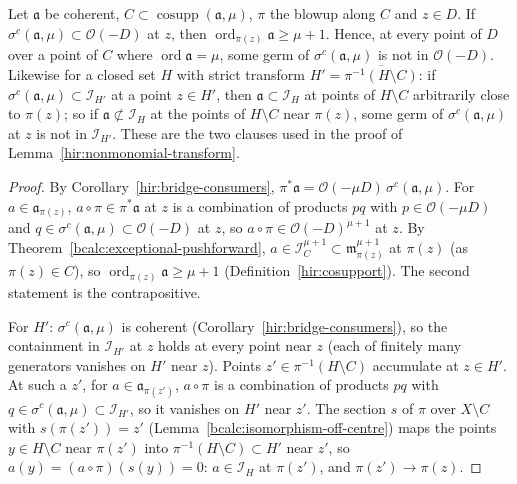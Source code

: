 \begin{corollary}
\label{bcalc:controlled-not-exceptional}
\mixedleanok
Let \(\mathfrak a\) be coherent, \(C\subset\operatorname{cosupp}(\mathfrak a,\mu)\), \(\pi\) the blowup along \(C\) and \(z\in D\). If \(\sigma^c(\mathfrak a,\mu)\subset\mathcal O(-D)\)
at \(z\), then \(\operatorname{ord}_{\pi(z)}\mathfrak a\ge\mu+1\). Hence, at every point of \(D\) over a point of \(C\) where \(\operatorname{ord}\mathfrak a=\mu\), some germ of
\(\sigma^c(\mathfrak a,\mu)\) is not in \(\mathcal O(-D)\). Likewise for a closed set \(H\) with strict transform \(H'=\overline{\pi^{-1}(H\setminus C)}\): if
\(\sigma^c(\mathfrak a,\mu)\subset\mathcal I_{H'}\) at a point \(z\in H'\), then \(\mathfrak a\subset\mathcal I_H\) at points of \(H\setminus C\) arbitrarily close to
\(\pi(z)\); so if \(\mathfrak a\not\subset\mathcal I_H\) at the points of \(H\setminus C\) near \(\pi(z)\), some germ of \(\sigma^c(\mathfrak a,\mu)\) at \(z\) is not in
\(\mathcal I_{H'}\). These are the two clauses used in the proof of Lemma~\ref{hir:nonmonomial-transform}.
\end{corollary}
\begin{proof}
\mixedleanok
By Corollary~\ref{hir:bridge-consumers}, \(\pi^*\mathfrak a=\mathcal O(-\mu D)\,\sigma^c(\mathfrak a,\mu)\). For \(a\in\mathfrak a_{\pi(z)}\), \(a\circ\pi\in\pi^*\mathfrak a\) at \(z\) is a
combination of products \(pq\) with \(p\in\mathcal O(-\mu D)\) and \(q\in\sigma^c(\mathfrak a,\mu)\subset\mathcal O(-D)\) at \(z\), so \(a\circ\pi\in\mathcal O(-D)^{\mu+1}\) at
\(z\). By Theorem~\ref{bcalc:exceptional-pushforward}, \(a\in\mathcal I_C^{\mu+1}\subset\mathfrak m_{\pi(z)}^{\mu+1}\) at \(\pi(z)\) (as \(\pi(z)\in C\)), so
\(\operatorname{ord}_{\pi(z)}\mathfrak a\ge\mu+1\) (Definition~\ref{hir:cosupport}). The second statement is the contrapositive.

For \(H'\): \(\sigma^c(\mathfrak a,\mu)\) is coherent (Corollary~\ref{hir:bridge-consumers}), so the containment in \(\mathcal I_{H'}\) at \(z\) holds at every
point near \(z\) (each of finitely many generators vanishes on \(H'\) near \(z\)). Points \(z'\in\pi^{-1}(H\setminus C)\) accumulate at \(z\in H'\). At such a
\(z'\), for \(a\in\mathfrak a_{\pi(z')}\), \(a\circ\pi\) is a combination of products \(pq\) with \(q\in\sigma^c(\mathfrak a,\mu)\subset\mathcal I_{H'}\), so it vanishes on
\(H'\) near \(z'\). The section \(s\) of \(\pi\) over \(X\setminus C\) with \(s(\pi(z'))=z'\) (Lemma~\ref{bcalc:isomorphism-off-centre}) maps the points
\(y\in H\setminus C\) near \(\pi(z')\) into \(\pi^{-1}(H\setminus C)\subset H'\) near \(z'\), so \(a(y)=(a\circ\pi)(s(y))=0\): \(a\in\mathcal I_H\) at \(\pi(z')\), and
\(\pi(z')\to\pi(z)\).
\end{proof}

